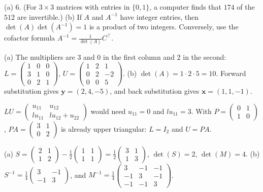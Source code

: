 \documentclass[11pt]{article}
\begin{document}
\begin{description}[leftmargin=0pt, itemsep=0.3em]
    \item[\ref{pr:01-matrices}.] (a) $6$. (For $3 \times 3$ matrices with entries in $\{0, 1\}$, a computer finds that $174$ of the $512$ are invertible.) (b) If $A$ and $A^{-1}$ have integer entries, then $\det(A)\det(A^{-1}) = 1$ is a product of two integers. Conversely, use the cofactor formula $A^{-1} = \frac{1}{\det(A)} C^\top$.
    \item[\ref{pr:lu-compute}.] (a) The multipliers are $3$ and $0$ in the first column and $2$ in the second: $L = \begin{pmatrix} 1 & 0 & 0 \\ 3 & 1 & 0 \\ 0 & 2 & 1 \end{pmatrix}$, $U = \begin{pmatrix} 1 & 2 & 1 \\ 0 & 2 & -2 \\ 0 & 0 & 5 \end{pmatrix}$. (b) $\det(A) = 1 \cdot 2 \cdot 5 = 10$. Forward substitution gives $\mathbf{y} = (2, 4, -5)$, and back substitution gives $\mathbf{x} = (1, 1, -1)$.
    \item[\ref{pr:lu-pivot}.] $LU = \begin{pmatrix} u_{11} & u_{12} \\ l u_{11} & lu_{12} + u_{22} \end{pmatrix}$ would need $u_{11} = 0$ and $lu_{11} = 3$. With $P = \begin{pmatrix} 0 & 1 \\ 1 & 0 \end{pmatrix}$, $PA = \begin{pmatrix} 3 & 1 \\ 0 & 2 \end{pmatrix}$ is already upper triangular: $L = I_2$ and $U = PA$.
    \item[\ref{pr:schur-practice}.] (a) $S = \begin{pmatrix} 2 & 1 \\ 1 & 2 \end{pmatrix} - \frac{1}{2}\begin{pmatrix} 1 & 1 \\ 1 & 1 \end{pmatrix} = \frac{1}{2}\begin{pmatrix} 3 & 1 \\ 1 & 3 \end{pmatrix}$, $\det(S) = 2$, $\det(M) = 4$. (b) $S^{-1} = \frac{1}{4}\begin{pmatrix} 3 & -1 \\ -1 & 3 \end{pmatrix}$, and $M^{-1} = \frac{1}{4}\begin{pmatrix} 3 & -1 & -1 \\ -1 & 3 & -1 \\ -1 & -1 & 3 \end{pmatrix}$.

\end{description}
\end{document}
